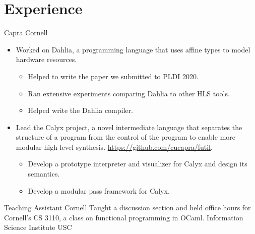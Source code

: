 \documentclass[10pt,a4paper,sans]{moderncv}        %
\begin{document}
\section{Experience}
{Capra}
{Cornell}
{}
{}
{
  \begin{itemize}
  \item Worked on Dahlia, a programming language that uses affine types to model
    hardware resources.
    \begin{itemize}
    \item Helped to write the paper we submitted to PLDI 2020.
    \item Ran extensive experiments comparing Dahlia to other HLS tools.
    \item Helped write the Dahlia compiler.
    \end{itemize}
  \item Lead the Calyx project, a novel intermediate language that separates the
    structure of a program from the control of the program to enable more
    modular high level synthesis. \url{https://github.com/cucapra/futil}.
    \begin{itemize}
    \item Develop a prototype interpreter and visualizer for Calyx and design
      its semantics.
    \item Develop a modular pass framework for Calyx.
    \end{itemize}
  \end{itemize}
}
%
{Teaching Assistant}
{Cornell}
{}
{}
{Taught a discussion section and held office hours for Cornell's CS 3110, a
  class on functional programming in OCaml.}
%
{Information Science Institute}
{USC}
{}
{}
\end{document}
